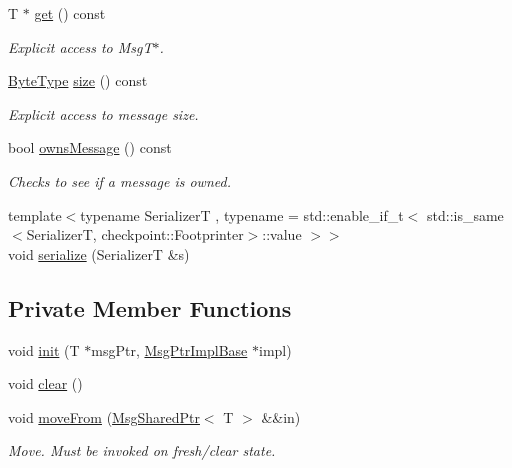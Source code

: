 \begin{DoxyCompactItemize}
T $\ast$ \hyperlink{structvt_1_1messaging_1_1_msg_shared_ptr_a6e6e25e087e662d9171fa20b5092efdd}{get} () const
\begin{DoxyCompactList}\small\item\em Explicit access to Msg\+T$\ast$. \end{DoxyCompactList}\item 
\hyperlink{namespacevt_aab8d55968084610ce3b17057981e9300}{Byte\+Type} \hyperlink{structvt_1_1messaging_1_1_msg_shared_ptr_a2ed79c214e294d8a15c930ee573f13b9}{size} () const
\begin{DoxyCompactList}\small\item\em Explicit access to message size. \end{DoxyCompactList}\item 
bool \hyperlink{structvt_1_1messaging_1_1_msg_shared_ptr_aea0124e8c6c53e91f3239a8ecf3cdca8}{owns\+Message} () const
\begin{DoxyCompactList}\small\item\em Checks to see if a message is owned. \end{DoxyCompactList}\item 
{\footnotesize template$<$typename SerializerT , typename  = std\+::enable\+\_\+if\+\_\+t$<$      std\+::is\+\_\+same$<$\+Serializer\+T, checkpoint\+::\+Footprinter$>$\+::value    $>$$>$ }\\void \hyperlink{structvt_1_1messaging_1_1_msg_shared_ptr_a604694c988590bdb3a35e403c677cba2}{serialize} (SerializerT \&s)
\end{DoxyCompactItemize}
\subsection*{Private Member Functions}
\begin{DoxyCompactItemize}
\item 
void \hyperlink{structvt_1_1messaging_1_1_msg_shared_ptr_a7117c1a8364c3267d4694b79a2f5cc6b}{init} (T $\ast$msg\+Ptr, \hyperlink{structvt_1_1messaging_1_1_msg_ptr_impl_base}{Msg\+Ptr\+Impl\+Base} $\ast$impl)
\item 
void \hyperlink{structvt_1_1messaging_1_1_msg_shared_ptr_ace4439c8585f3d3c50b861570db07d99}{clear} ()
\item 
void \hyperlink{structvt_1_1messaging_1_1_msg_shared_ptr_a351f61999bc2f15ec3027fcb76c9a942}{move\+From} (\hyperlink{structvt_1_1messaging_1_1_msg_shared_ptr}{Msg\+Shared\+Ptr}$<$ T $>$ \&\&in)
\begin{DoxyCompactList}\small\item\em Move. Must be invoked on fresh/clear state. \end{DoxyCompactList}\end{DoxyCompactItemize}
